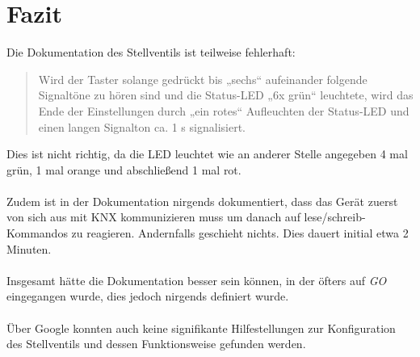 \documentclass[a4paper]{article}
\begin{document}
\section{Fazit}
Die Dokumentation des Stellventils ist teilweise fehlerhaft:
\begin{quotation}
	Wird der Taster solange gedrückt bis „sechs“ aufeinander folgende Signaltöne zu hören sind und die Status-LED „6x grün“ leuchtete, wird das Ende der Einstellungen durch „ein rotes“ Aufleuchten der Status-LED und einen langen Signalton ca. 1 s signalisiert.
\end{quotation}
Dies ist nicht richtig, da die LED leuchtet wie an anderer Stelle angegeben 4 mal grün, 1 mal orange und abschließend 1 mal rot.\\
\\
Zudem ist in der Dokumentation nirgends dokumentiert, dass das Gerät zuerst von sich aus mit KNX kommunizieren muss um danach auf lese/schreib-Kommandos zu reagieren. Andernfalls geschieht nichts. Dies dauert initial etwa 2 Minuten.\\
\\
Insgesamt hätte die Dokumentation besser sein können, in der öfters auf \emph{GO} eingegangen wurde, dies jedoch nirgends definiert wurde.\\
\\
Über Google konnten auch keine signifikante Hilfestellungen zur Konfiguration des Stellventils und dessen Funktionsweise gefunden werden.\\
\end{document}
